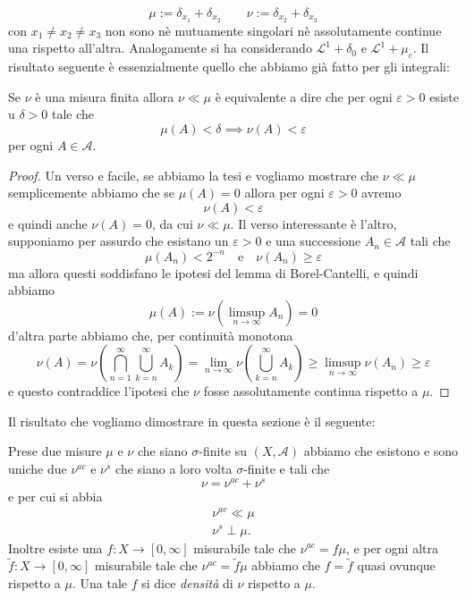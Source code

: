 \documentclass[11pt]{scrartcl}
\begin{document}
	$$\mu:= \delta_{x_1}+\delta_{x_2}\qquad \nu:=\delta_{x_2}+\delta_{x_3}$$
	con $x_1\ne x_2\ne x_3$ non sono nè mutuamente singolari nè assolutamente continue una rispetto all'altra. Analogamente si ha considerando $\mathscr{L}^1+\delta_0$ e $\mathscr{L}^1+\mu_c$. Il risultato seguente è essenzialmente quello che abbiamo già fatto per gli integrali:
	\begin{proposition}
		Se $\nu$ è una misura finita allora $\nu \ll \mu$ è equivalente a dire che per ogni $\varepsilon>0$ esiste u $\delta>0$ tale che
		$$\mu(A)<\delta \implies \nu(A)<\varepsilon$$
		per ogni $A\in \mathcal{A}$.
	\end{proposition}
	\begin{proof}
		Un verso e facile, se abbiamo la tesi e vogliamo mostrare che $\nu \ll \mu$ semplicemente abbiamo che se $\mu(A)=0$ allora per ogni $\varepsilon>0$ avremo
		$$\nu(A)<\varepsilon$$
		e quindi anche $\nu(A)=0$, da cui $\nu\ll\mu$. Il verso interessante è l'altro, supponiamo per assurdo che esistano un $\varepsilon>0$ e una successione $A_n\in \mathcal{A}$ tali che
		$$\mu(A_n)<2^{-n} \quad \text{e}\quad \nu(A_n)\ge \varepsilon$$
		ma allora questi soddisfano le ipotesi del lemma di Borel-Cantelli, e quindi abbiamo
		$$\mu(A):=\nu\left(\limsup_{n\to\infty}A_n\right)=0$$
		d'altra parte abbiamo che, per continuità monotona
		$$\nu(A)=\nu\left(\bigcap_{n=1}^\infty\bigcup_{k=n}^\infty A_k\right)=\lim_{n\to\infty}\nu\left(\bigcup_{k=n}^\infty A_k\right)\ge \limsup_{n\to\infty}\nu(A_n)\ge \varepsilon$$
		e questo contraddice l'ipotesi che $\nu$ fosse assolutamente continua rispetto a $\mu$.
	\end{proof}
	Il risultato che vogliamo dimostrare in questa sezione è il seguente: 
	\begin{theorem*}
		Prese due misure $\mu$ e $\nu$ che siano $\sigma$-finite su $(X,\mathcal{A})$ abbiamo che esistono e sono uniche due $\nu^{ac}$ e $\nu^s$ che siano a loro volta $\sigma$-finite e tali che
		$$\nu=\nu^{ac}+\nu^s$$
		e per cui si abbia
		\begin{gather*}
			\nu^{ac}\ll \mu \\
			\nu^s \perp \mu.
		\end{gather*}
		Inoltre esiste una $f:X\to [0,\infty]$ misurabile tale che $\nu^{ac}=f\mu$, e per ogni altra $\tilde{f}:X\to [0,\infty]$ misurabile tale che $\nu^{ac}=\tilde{f}\mu$ abbiamo che $f=\tilde{f}$ quasi ovunque rispetto a $\mu$. Una tale $f$ si dice \textit{densità} di $\nu$ rispetto a $\mu$.
	\end{theorem*}
\end{document}
